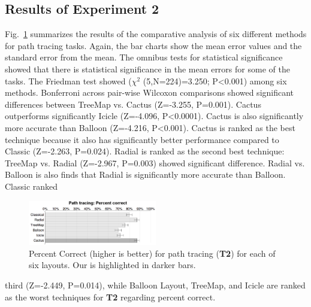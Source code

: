 \documentclass[a4paper]{llncs}
\begin{document}
\subsection{Results of Experiment 2}

Fig.~\ref{fig:T2-correct} summarizes the results of the comparative analysis of six different methods for path tracing tasks. Again, the bar charts show the mean error values and the standard error from the mean. The omnibus tests for statistical significance showed that there is statistical significance in the mean errors for some of the tasks. The Friedman test showed ($\chi^2$ (5,N=224)=3.250; P\textless0.001) among six methods. Bonferroni across pair-wise Wilcoxon comparisons showed significant differences between TreeMap vs. Cactus (Z=-3.255, P=0.001). Cactus outperforms significantly Icicle (Z=-4.096, P\textless0.0001). Cactus is also significantly more accurate than Balloon (Z=-4.216, P\textless0.001). Cactus is ranked as the best technique because it also has significantly better performance compared to Classic (Z=-2.263, P=0.024). Radial is ranked as the second best technique: TreeMap vs. Radial (Z=-2.967, P=0.003) showed significant difference. Radial vs. Balloon is also finds that Radial is significantly more accurate than Balloon. Classic ranked 
\begin{figure}
 \centering
 \includegraphics[width=0.5\textwidth]{figures2/T2-correct.png}
 \caption{\label{fig:T2-correct} Percent Correct (higher is better) for path tracing (\textbf{T2}) for each of six layouts. Our \theName{} is highlighted in darker bars.}
\end{figure}
third (Z=-2.449, P=0.014), while Balloon Layout, TreeMap, and Icicle are ranked as the worst techniques for \textbf{T2} regarding percent correct.

\end{document}
